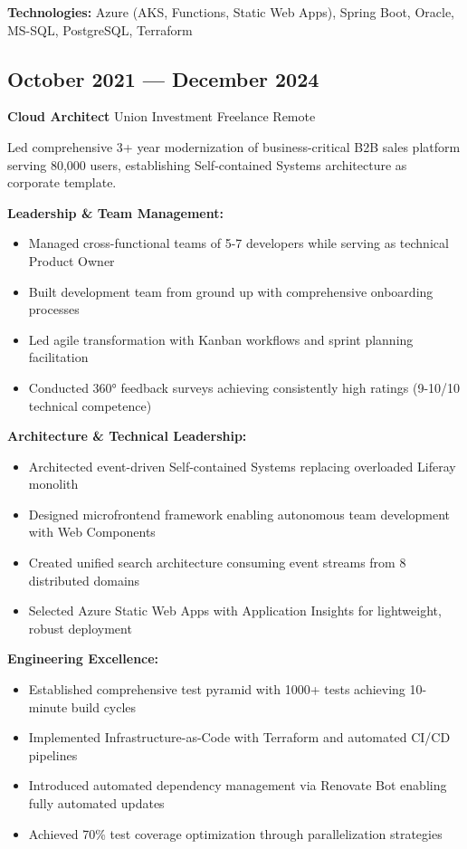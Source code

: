 \documentclass[10pt,a4paper]{article}
\newcommand{\role}[4]{\subsection{#1}\textbf{#2} \textbar{} #3 \textbar{} #4\vspace{2pt}}
\begin{document}
\textbf{Technologies:} Azure (AKS, Functions, Static Web Apps), Spring Boot, Oracle, MS-SQL, PostgreSQL, Terraform

\vspace{4pt}

\role{October 2021 — December 2024}{Cloud Architect}{Union Investment}{Freelance \textbar{} Remote}

Led comprehensive 3+ year modernization of business-critical B2B sales platform serving 80,000 users, establishing Self-contained Systems architecture as corporate template.

\textbf{Leadership \& Team Management:}
\begin{itemize}[leftmargin=12pt,itemsep=1pt]
\item Managed cross-functional teams of 5-7 developers while serving as technical Product Owner
\item Built development team from ground up with comprehensive onboarding processes
\item Led agile transformation with Kanban workflows and sprint planning facilitation
\item Conducted 360° feedback surveys achieving consistently high ratings (9-10/10 technical competence)
\end{itemize}

\textbf{Architecture \& Technical Leadership:}
\begin{itemize}[leftmargin=12pt,itemsep=1pt]
\item Architected event-driven Self-contained Systems replacing overloaded Liferay monolith
\item Designed microfrontend framework enabling autonomous team development with Web Components
\item Created unified search architecture consuming event streams from 8 distributed domains
\item Selected Azure Static Web Apps with Application Insights for lightweight, robust deployment
\end{itemize}

\textbf{Engineering Excellence:}
\begin{itemize}[leftmargin=12pt,itemsep=1pt]
\item Established comprehensive test pyramid with 1000+ tests achieving 10-minute build cycles
\item Implemented Infrastructure-as-Code with Terraform and automated CI/CD pipelines
\item Introduced automated dependency management via Renovate Bot enabling fully automated updates
\item Achieved 70\% test coverage optimization through parallelization strategies
\end{itemize}
\end{document}
